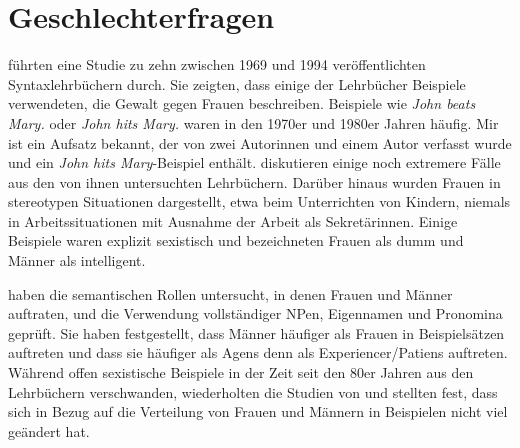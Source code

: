 \section*{Geschlechterfragen}


\citet{MB97a} führten eine Studie zu zehn zwischen 1969 und 1994 veröffentlichten
Syntaxlehrbüchern durch. Sie zeigten, dass einige der Lehrbücher Beispiele verwendeten, die Gewalt
gegen Frauen beschreiben. Beispiele wie \emph{John beats Mary.} oder \emph{John hits Mary.} waren in
den 1970er und 1980er Jahren häufig. Mir ist ein Aufsatz bekannt, der von zwei Autorinnen und einem
Autor verfasst wurde und ein \emph{John hits Mary}-Beispiel enthält. \citet[]{MB97a}
diskutieren einige noch extremere Fälle aus den von ihnen untersuchten Lehrbüchern. Darüber hinaus
wurden Frauen in stereotypen Situationen dargestellt, etwa beim Unterrichten von Kindern, niemals in
Arbeitssituationen mit Ausnahme der Arbeit als Sekretärinnen. Einige Beispiele waren explizit
sexistisch und bezeichneten Frauen als dumm und Männer als intelligent.


\citeauthor{MB97a} haben die semantischen Rollen untersucht, in denen Frauen und Männer auftraten, und
die Verwendung vollständiger NPen, Eigennamen und Pronomina geprüft. Sie haben festgestellt, dass Männer
häufiger als Frauen in Beispielsätzen auftreten und dass sie häufiger als Agens denn als
Experiencer/Patiens auftreten. Während offen sexistische Beispiele in der Zeit seit den 80er Jahren
aus den Lehrbüchern verschwanden, wiederholten \citet{PCKSDMC2017a} die Studien von
\citeauthor{MB97a} und stellten fest, dass sich in Bezug auf die Verteilung von Frauen und Männern in
Beispielen nicht viel geändert hat.


